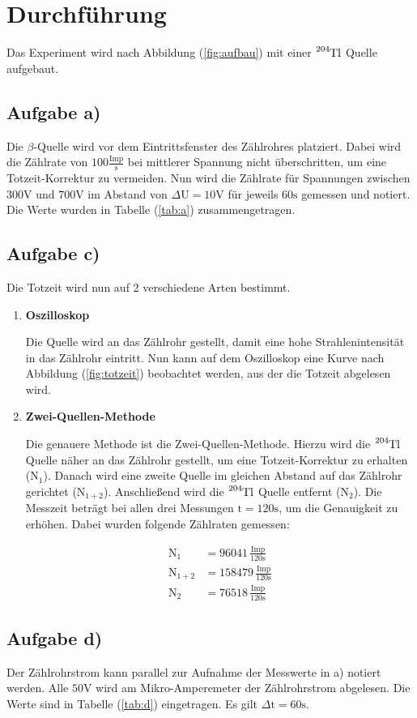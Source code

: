 \section{Durchführung}
Das Experiment wird nach Abbildung (\ref{fig:aufbau}) mit einer $\ce{^{204}Tl}$ Quelle aufgebaut.




\subsection{Aufgabe a)}
Die $\beta$-Quelle wird vor dem Eintrittsfenster des Zählrohres platziert.
Dabei wird die Zählrate von $100\frac{\text{Imp}}{\text{s}}$ bei mittlerer Spannung nicht überschritten, um eine Totzeit-Korrektur zu vermeiden.
Nun wird die Zählrate für Spannungen zwischen $300\si{\volt}$ und $700\si{\volt}$ im Abstand von $\Delta \text{U} =10 \si{\volt}$ für jeweils $60\si{\second}$ gemessen und notiert.
Die Werte wurden in Tabelle (\ref{tab:a}) zusammengetragen.


\subsection{Aufgabe c)}
\label{tab:n}
Die Totzeit wird nun auf 2 verschiedene Arten bestimmt.
\begin{enumerate}
\item \textbf{Oszilloskop}

Die Quelle wird an das Zählrohr gestellt, damit eine hohe Strahlenintensität in das Zählrohr eintritt.
Nun kann auf dem Oszilloskop eine Kurve nach Abbildung (\ref{fig:totzeit}) beobachtet werden, aus der die Totzeit abgelesen wird.

\item \textbf{Zwei-Quellen-Methode}

Die genauere Methode ist die Zwei-Quellen-Methode.
Hierzu wird die $\ce{^{204}Tl}$ Quelle näher an das Zählrohr gestellt, um eine Totzeit-Korrektur zu erhalten ($\text{N}_1$).
Danach wird eine zweite Quelle im gleichen Abstand auf das Zählrohr gerichtet ($\text{N}_{1+2}$).
Anschließend wird die $\ce{^{204}Tl}$ Quelle entfernt ($\text{N}_2$).
Die Messzeit beträgt bei allen drei Messungen $\text{t}=120 \si{\second}$, um die Genauigkeit zu erhöhen.
Dabei wurden folgende Zählraten gemessen:

\begin{align*}
\text{N}_1 &= 96041 \, \frac{\text{Imp}}{120\si{\second}} \\
\text{N}_{1+2} &= 158479 \, \frac{\text{Imp}}{120\si{\second}} \\
\text{N}_2 &= 76518 \, \frac{\text{Imp}}{120\si{\second}}
\end{align*}


\end{enumerate}

\subsection{Aufgabe d)}
Der Zählrohrstrom kann parallel zur Aufnahme der Messwerte in a) notiert werden.
Alle $50 \si{\volt}$ wird am Mikro-Amperemeter der Zählrohrstrom abgelesen.
Die Werte sind in Tabelle (\ref{tab:d}) eingetragen.
Es gilt $\Delta \text{t}=60\si{\second}$.